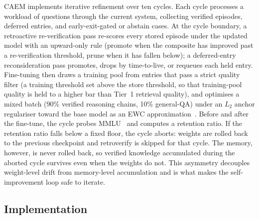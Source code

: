CAEM implements iterative refinement over ten cycles. Each cycle processes a workload of questions through the current system, collecting verified episodes, deferred entries, and early-exit-gated or abstain cases. At the cycle boundary, a retroactive re-verification pass re-scores every stored episode under the updated model with an upward-only rule (promote when the composite has improved past a re-verification threshold, prune when it has fallen below); a deferred-entry reconsideration pass promotes, drops by time-to-live, or requeues each held entry. Fine-tuning then draws a training pool from entries that pass a strict quality filter (a training threshold set above the store threshold, so that training-pool quality is held to a higher bar than Tier~1 retrieval quality), and optimises a mixed batch (90\% verified reasoning chains, 10\% general-QA) under an $L_2$ anchor regulariser toward the base model as an EWC approximation~\cite{doi:10.1073/pnas.1611835114}. Before and after the fine-tune, the cycle probes MMLU~\cite{hendrycks2021measuring} and computes a retention ratio. If the retention ratio falls below a fixed floor, the cycle aborts: weights are rolled back to the previous checkpoint and retroverify is skipped for that cycle. The memory, however, is never rolled back, so verified knowledge accumulated during the aborted cycle survives even when the weights do not. This asymmetry decouples weight-level drift from memory-level accumulation and is what makes the self-improvement loop safe to iterate.

\subsection{Implementation}


